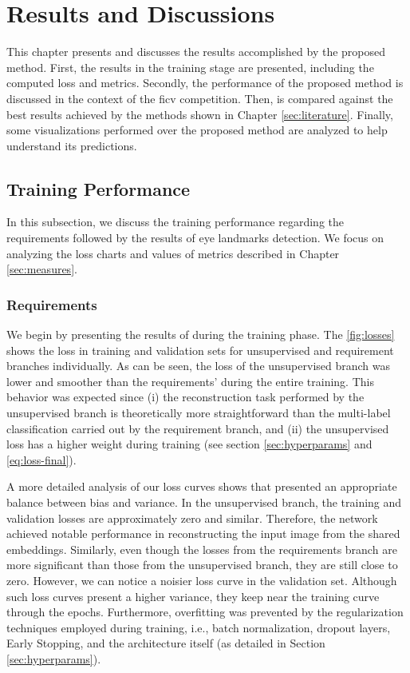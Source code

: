 \section{Results and Discussions} \label{sec:results}
 
This chapter presents and discusses the results accomplished by the proposed method. First, the \methodname results in the training stage are presented, including the computed loss and metrics. Secondly, the performance of the proposed method is discussed in the context of the \acs{ficv} competition. Then, \methodname is compared against the best results achieved by the methods shown in Chapter \ref{sec:literature}. Finally, some visualizations performed over the proposed method are analyzed to help understand its predictions.
 
\subsection{Training Performance}
 
In this subsection, we discuss the training performance regarding the \icao requirements followed by the results of eye landmarks detection. We focus on analyzing the loss charts and values of metrics described in Chapter \ref{sec:measures}.
 
\subsubsection{Requirements}
 
We begin by presenting the results of \methodname during the training phase. The \autoref{fig:losses} shows the loss in training and validation sets for unsupervised and requirement branches individually. As can be seen, the loss of the unsupervised branch was lower and smoother than the requirements' during the entire training. This behavior was expected since (i) the reconstruction task performed by the unsupervised branch is theoretically more straightforward than the multi-label classification carried out by the requirement branch, and (ii) the unsupervised loss has a higher weight during training (see section \ref{sec:hyperparams} and \autoref{eq:loss-final}). 
 
A more detailed analysis of our loss curves shows that \methodname presented an appropriate balance between bias and variance. In the unsupervised branch, the training and validation losses are approximately zero and similar. Therefore, the network achieved notable performance in reconstructing the input image from the shared embeddings. Similarly, even though the losses from the requirements branch are more significant than those from the unsupervised branch, they are still close to zero. However, we can notice a noisier loss curve in the validation set. Although such loss curves present a higher variance, they keep near the training curve through the epochs. Furthermore, overfitting was prevented by the regularization techniques employed during training, i.e., batch normalization, dropout layers, Early Stopping, and the architecture itself (as detailed in Section \ref{sec:hyperparams}).
 
